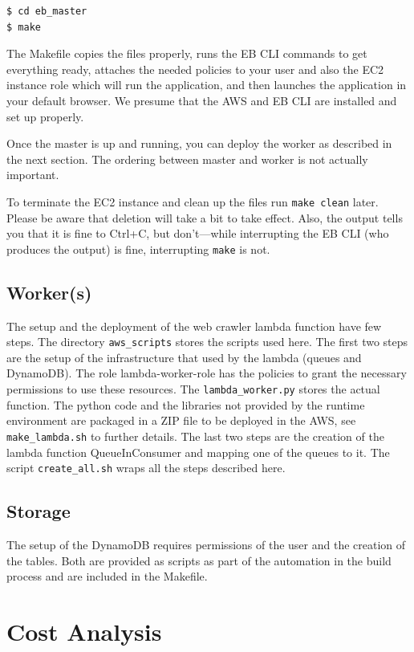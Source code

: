 \documentclass[english]{scrartcl}
\begin{document}
\begin{verbatim}
$ cd eb_master
$ make
\end{verbatim}

The Makefile copies the files properly, runs the EB CLI commands to get
everything ready, attaches the needed policies to your user and also the EC2
instance role which will run the application, and then launches the application
in your default browser. We presume that the AWS and EB CLI are installed and
set up properly.

Once the master is up and running, you can deploy the worker as described in
the next section. The ordering between master and worker is not actually
important.

To terminate the EC2 instance and clean up the files run \texttt{make clean}
later. Please be aware that deletion will take a bit to take effect. Also, the
output tells you that it is fine to Ctrl+C, but don't---while interrupting the
EB CLI (who produces the output) is fine, interrupting \texttt{make} is not.

\subsection{Worker(s)}

The setup and the deployment of the web crawler lambda function have few steps. The directory \texttt{aws\_scripts} stores the scripts used here. The first two steps are the setup of the infrastructure that used by the lambda (queues and DynamoDB). The role lambda-worker-role has the policies to grant the necessary permissions to use these resources. The \texttt{lambda\_worker.py} stores the actual function. The python code and the libraries not provided by the runtime environment are packaged in a ZIP file to be deployed in the AWS, see \texttt{make\_lambda.sh} to further details. The last two steps are the creation of the lambda function QueueInConsumer and mapping one of the queues to it. The script \texttt{create\_all.sh} wraps all the steps described here.

\subsection{Storage}
The setup of the DynamoDB requires permissions of the user and the creation of the tables.
Both are provided as scripts as part of the automation in the build process and are included in the Makefile.

\section{Cost Analysis}
\end{document}
